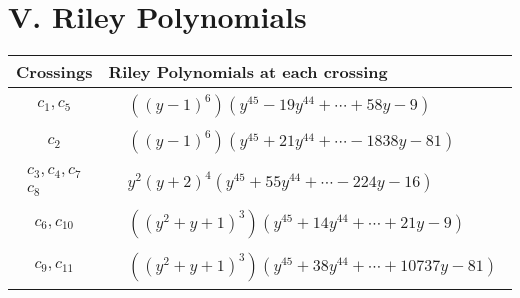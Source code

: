 \documentclass[1p]{elsarticle_modified}
\theoremstyle{definition}
\begin{document}
\centering \section*{ V. Riley Polynomials}
\begin{tabular}{m{50pt}|m{274pt}}
Crossings & \hspace{64pt}Riley Polynomials at each crossing \\
\hline $$\begin{aligned}c_{1},c_{5}\end{aligned}$$&$\begin{aligned}
&((y-1)^6)(y^{45}-19 y^{44}+\cdots+58 y-9)
\end{aligned}$\\
\hline $$\begin{aligned}c_{2}\end{aligned}$$&$\begin{aligned}
&((y-1)^6)(y^{45}+21 y^{44}+\cdots-1838 y-81)
\end{aligned}$\\
\hline $$\begin{aligned}c_{3},c_{4},c_{7}\\c_{8}\end{aligned}$$&$\begin{aligned}
&y^2(y+2)^4(y^{45}+55 y^{44}+\cdots-224 y-16)
\end{aligned}$\\
\hline $$\begin{aligned}c_{6},c_{10}\end{aligned}$$&$\begin{aligned}
&((y^2+y+1)^3)(y^{45}+14 y^{44}+\cdots+21 y-9)
\end{aligned}$\\
\hline $$\begin{aligned}c_{9},c_{11}\end{aligned}$$&$\begin{aligned}
&((y^2+y+1)^3)(y^{45}+38 y^{44}+\cdots+10737 y-81)
\end{aligned}$\\
\hline
\end{tabular}
\vskip 2pc
\end{document}
